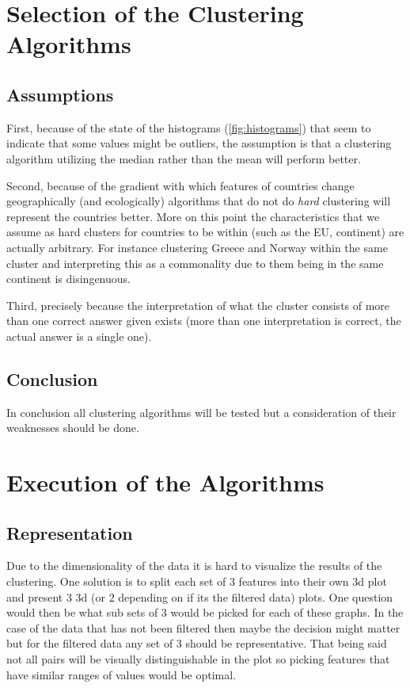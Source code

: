 \documentclass[12pt, a4paper]{article}
\begin{document}
\section{Selection of the Clustering Algorithms}

\subsection{Assumptions}
First, because of the state of the histograms (\ref{fig:histograms}) that seem to indicate that some values might be outliers, the assumption is that a clustering algorithm utilizing the median rather than the mean will perform better.

Second, because of the gradient with which features of countries change geographically (and ecologically) algorithms that do not do \textit{hard} clustering will represent the countries better. More on this point the characteristics that we assume as hard clusters for countries to be within (such as the EU, continent) are actually arbitrary. For instance clustering Greece and Norway within the same cluster and interpreting this as a commonality due to them being in the same continent is disingenuous.

Third, precisely because the interpretation of what the cluster consists of more than one correct answer given exists (more than one interpretation is correct, the actual answer is a single one).

\subsection{Conclusion}

In conclusion all clustering algorithms will be tested but a consideration of their weaknesses should be done.

\section{Execution of the Algorithms}

\subsection{Representation}

Due to the dimensionality of the data it is hard to visualize the results of the clustering. One solution is to split each set of 3 features into their own 3d plot and present 3 3d (or 2 depending on if its the filtered data) plots. One question would then be what sub sets of 3 would be picked for each of these graphs. In the case of the data that has not been filtered then maybe the decision might matter but for the filtered data any set of 3 should be representative. That being said not all pairs will be visually distinguishable in the plot so picking features that have similar ranges of values would be optimal.
\newline
\end{document}

